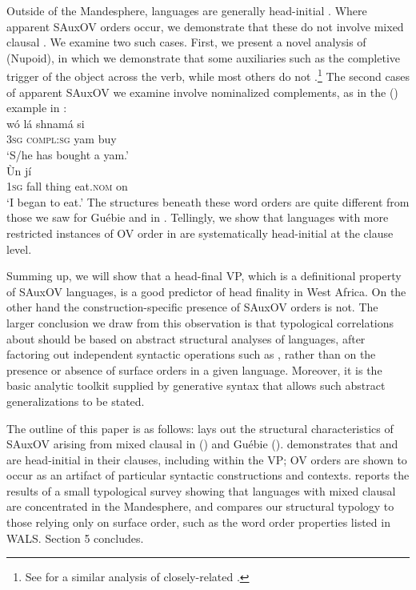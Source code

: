 \documentclass[output=paper]{LSP/langsci}
\begin{document}
Outside of the Mandesphere, languages are generally head-initial \citep{heine76}. Where apparent SAuxOV orders occur, we demonstrate that these do not involve mixed clausal  \citep{manfredi97,kandy03, aboh09}. We examine two such cases. First, we present a novel analysis of  (Nupoid), in which we demonstrate that some auxiliaries such as the completive trigger  of the object across the verb, while most others do not .\footnote{See \citet{kandy03} for a similar analysis of closely-related .} The second cases of apparent SAuxOV we examine involve nominalized complements, as in the  () example in :
\ea \label{ex:2:fakesauxov}
\ea {} \label{ex:2a:gwari}\\
\gll w\'o l\'a shnam\'a si \\
3\textsc{sg} \textsc{compl:sg} yam buy \\
\glt `S/he has bought a yam.'
\ex {} \label{ex:2b:gwari} \\	
\gll \`Un    j\'i  \\
1\textsc{sg} fall thing eat.\textsc{nom} on  \\
\glt `I began to eat.'
\z
\z
The structures beneath these word orders are quite different from those we saw for Gu\'ebie and  in . Tellingly, we show that languages with more restricted instances of OV order in  are systematically head-initial at the clause level. 

Summing up, we will show that a head-final VP, which is a definitional property of SAuxOV languages, is a good predictor of head finality in West Africa. On the other hand the construction-specific presence of SAuxOV orders is not. The larger conclusion we draw from this observation is that typological correlations about  should be based on abstract structural analyses of languages, after factoring out independent syntactic operations such as , rather than on the presence or absence of surface orders in a given language. Moreover, it is the basic analytic toolkit supplied by generative syntax that allows such abstract generalizations to be stated.
 
 The outline of this paper is as follows:  lays out the structural characteristics of SAuxOV arising from mixed clausal  in  () and Gu\'ebie ().  demonstrates that  and  are head-initial in their clauses, including within the VP; OV orders are shown to occur as an artifact of particular syntactic constructions and contexts.  reports the results of a small typological survey showing that languages with mixed clausal  are concentrated in the Mandesphere, and compares our structural typology to those relying only on surface order, such as the word order properties listed in WALS. Section 5 concludes. 
\end{document}
